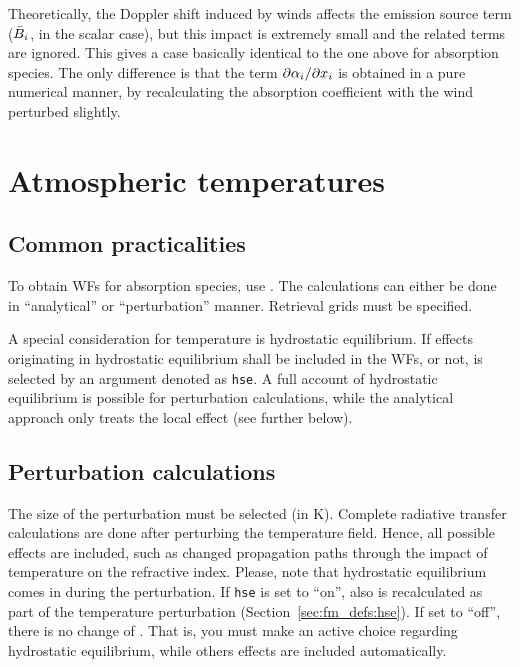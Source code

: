 Theoretically, the Doppler shift induced by winds affects the emission source
term ($\bar{B}_i$, in the scalar case), but this impact is extremely small
and the related terms are ignored. This gives a case basically identical to the
one above for absorption species. The only difference is that the term
$\partial{\alpha}_{i}/\partial x_{i}$ is obtained in a pure numerical manner,
by recalculating the absorption coefficient with the wind perturbed slightly.





\section{Atmospheric temperatures}
\label{sec:wfuns:atmtemp}

\subsection{Common practicalities}
%
To obtain WFs for absorption species, use .
The calculations can either be done in ``analytical'' or ``perturbation''
manner. Retrieval grids must be specified.

A special consideration for temperature is hydrostatic equilibrium. If effects
originating in hydrostatic equilibrium shall be included in the WFs, or
not, is selected by an argument denoted as \verb|hse|. A full account of
hydrostatic equilibrium is possible for perturbation calculations, while the
analytical approach only treats the local effect (see further below).


\subsection{Perturbation calculations}
%
The size of the perturbation must be selected (in K).
Complete radiative transfer calculations are done after perturbing the
temperature field. Hence, all possible effects are included, such as changed
propagation paths through the impact of temperature on the refractive index.
Please, note that hydrostatic equilibrium comes in during the perturbation. If
\verb|hse| is set to ``on'', also  is recalculated as part
of the temperature perturbation (Section~\ref{sec:fm_defs:hse}). If set to
``off'', there is no change of . That is, you must make an
active choice regarding hydrostatic equilibrium, while others effects are
included automatically.


